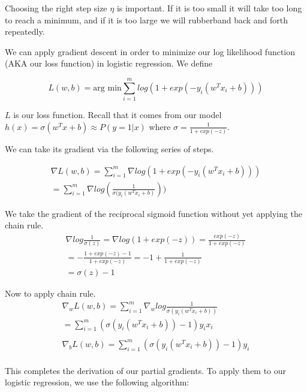 Choosing the right step size $\eta$ is important. If it is too small it will take too long to reach a minimum, and if it is too large we will rubberband back and forth repeatedly.
\begin{center}
\end{center}

We can apply gradient descent in order to minimize our log likelihood function (AKA our loss function) in logistic regression. We define 

$$ L(w, b) = \text{arg min} \sum_{i=1}^{m}log(1+exp(-y_i(w^Tx_i + b)))$$

$L$ is our loss function. Recall that it comes from our model $h(x) = \sigma(w^Tx+b) \approx P(y = 1 | x)$ where $\sigma = \frac{1}{1+exp(-z)}$.

We can take its gradient via the following series of steps. 

\begin{align*}
    \nabla L(w, b) = \sum_{i=1}^{m} \nabla log(1+exp(-y_i(w^Tx_i + b))) \\
     = \sum_{i=1}^{m} \nabla log(\frac{1}{\sigma(y_i(w^Tx_i+b)}))
\end{align*}


We take the gradient of the reciprocal sigmoid function without yet applying the chain rule.
\begin{align*}
    \nabla log\frac{1}{\sigma(z)} = \nabla log(1+exp(-z)) = \frac{exp(-z)}{1+exp(-z)} \\
    = -\frac{1 + exp(-z) - 1}{1 + exp(-z)} = -1 + \frac{1}{1 + exp(-z)} \\
    = \sigma(z) - 1
\end{align*}

Now to apply chain rule.
\begin{align*}
    \nabla_w L(w, b) = \sum_{i=1}^m \nabla_w log\frac{1}{\sigma(y_i(w^Tx_i + b))} \\
    = \sum_{i=1}^m (\sigma(y_i(w^Tx_i +b)) - 1)y_ix_i \\
    \\
    \nabla_b L(w, b) = \sum_{i=1}^m (\sigma(y_i(w^Tx_i +b)) - 1)y_i \\
\end{align*}

This completes the derivation of our partial gradients. To apply them to our logistic regression, we use the following algorithm:

\vspace{.25cm}


